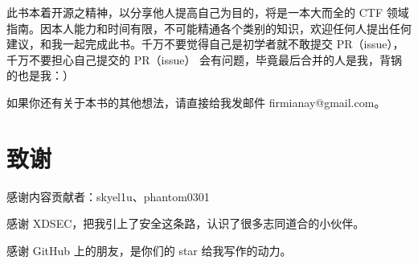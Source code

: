     \indent 此书本着开源之精神，以分享他人提高自己为目的，将是一本大而全的 CTF 领域指南。因本人能力和时间有限，不可能精通各个类别的知识，欢迎任何人提出任何建议，和我一起完成此书。千万不要觉得自己是初学者就不敢提交 PR（issue），千万不要担心自己提交的 PR（issue） 会有问题，毕竟最后合并的人是我，背锅的也是我：）

    \indent 如果你还有关于本书的其他想法，请直接给我发邮件 firmianay@gmail.com。

\section{致谢}
\indent \setlength{\parindent}{2em}

\indent 感谢内容贡献者：skyel1u、phantom0301

\indent 感谢 XDSEC，把我引上了安全这条路，认识了很多志同道合的小伙伴。

\indent 感谢 GitHub 上的朋友，是你们的 star 给我写作的动力。

